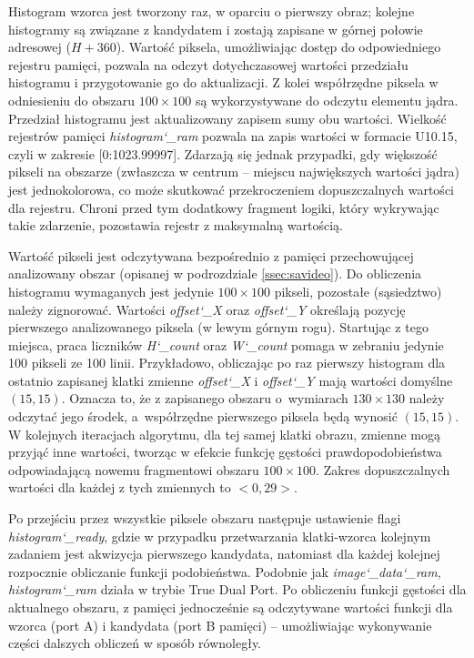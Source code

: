 Histogram wzorca jest tworzony raz, w oparciu o pierwszy obraz; kolejne histogramy są związane z kandydatem i zostają zapisane w górnej połowie adresowej ($H+360$). 
Wartość piksela, umożliwiając dostęp do odpowiedniego rejestru pamięci, pozwala na odczyt dotychczasowej wartości przedziału histogramu i przygotowanie go do aktualizacji. 
Z kolei współrzędne piksela w odniesieniu do obszaru $100 \times 100$ są wykorzystywane do odczytu elementu jądra. 
Przedział histogramu jest aktualizowany zapisem sumy obu wartości. 
Wielkość rejestrów pamięci \textit{histogram\char`_ram} pozwala na zapis wartości w formacie U10.15, czyli w zakresie [0:1023.99997]. %
Zdarzają się jednak przypadki, gdy większość pikseli na obszarze (zwłaszcza w centrum -- miejscu największych wartości jądra) jest jednokolorowa, co może skutkować przekroczeniem dopuszczalnych wartości dla rejestru. 
Chroni przed tym dodatkowy fragment logiki, który wykrywając takie zdarzenie, pozostawia rejestr z maksymalną wartością.

Wartość pikseli jest odczytywana bezpośrednio z pamięci przechowującej analizowany obszar  (opisanej w podrozdziale \ref{ssec:savideo}). 
Do obliczenia histogramu wymaganych jest jedynie $100\times 100$ pikseli, pozostałe (sąsiedztwo) należy zignorować. 
Wartości \textit{offset\char`_X} oraz \textit{offset\char`_Y} określają pozycję pierwszego analizowanego piksela (w lewym górnym rogu). 
Startując z tego miejsca, praca liczników \textit{H\char`_count} oraz \textit{W\char`_count} pomaga w zebraniu jedynie 100 pikseli ze 100 linii. 
Przykładowo, obliczając po raz pierwszy histogram dla ostatnio zapisanej klatki zmienne \textit{offset\char`_X} i \textit{offset\char`_Y} mają wartości domyślne $(15,15)$. 
Oznacza to, że z zapisanego obszaru o~wymiarach $130\times 130$ należy odczytać jego środek, a~współrzędne pierwszego piksela będą wynosić $(15,15)$. 
W kolejnych iteracjach algorytmu, dla tej samej klatki obrazu, zmienne mogą przyjąć inne wartości, tworząc w efekcie funkcję gęstości prawdopodobieństwa odpowiadającą nowemu fragmentowi obszaru $100\times 100$. 
Zakres dopuszczalnych wartości dla każdej z tych zmiennych to $<0,29>$. 

Po przejściu przez wszystkie piksele obszaru następuje ustawienie flagi \textit{histogram\char`_ready}, gdzie w przypadku przetwarzania klatki-wzorca kolejnym zadaniem jest akwizycja pierwszego kandydata, natomiast dla każdej kolejnej rozpocznie obliczanie funkcji podobieństwa.
Podobnie jak \textit{image\char`_data\char`_ram}, \textit{histogram\char`_ram} działa w trybie True Dual Port. 
Po obliczeniu funkcji gęstości dla aktualnego obszaru, z pamięci jednocześnie są odczytywane wartości funkcji dla wzorca (port A) i kandydata (port B pamięci) -- umożliwiając wykonywanie części dalszych obliczeń w sposób równoległy. 

